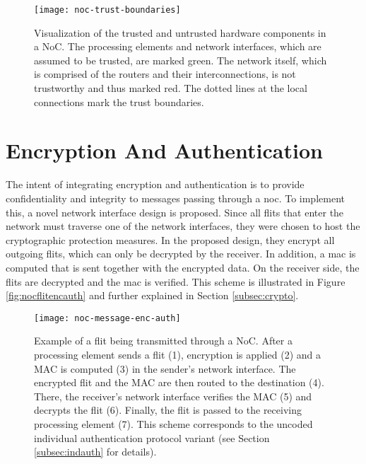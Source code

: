 \begin{figure}
    \centering
    \texttt{[image: noc-trust-boundaries]}
    \caption[Trust boundaries in a NoC]{Visualization of the trusted and untrusted hardware components in a NoC. The processing elements and network
    interfaces, which are assumed to be trusted, are marked green. The network itself, which is comprised of the routers and their interconnections,
    is not trustworthy and thus marked red. The dotted lines at the local connections mark the trust boundaries.}
    \label{fig:noctrustboundaries}
\end{figure}

\section{Encryption And Authentication}\label{sec:encandauth}
The intent of integrating encryption and authentication is to provide confidentiality and integrity to messages passing through a \gls{noc}. To
implement this, a novel network interface design is proposed. Since all flits that enter the network must traverse one of the network interfaces,
they were chosen to host the cryptographic protection measures. In the proposed design, they encrypt all outgoing flits, which can only be decrypted by the
receiver. In addition, a \gls{mac} is computed that is sent together with the encrypted data. On the receiver side, the flits are decrypted and the
\gls{mac} is verified. This scheme is illustrated in Figure \vref{fig:nocflitencauth} and further explained in Section \ref{subsec:crypto}.

\begin{figure}
    \centering
    \texttt{[image: noc-message-enc-auth]}
    \caption[Flit in a NoC with encryption and authentication]{Example of a flit being transmitted through a NoC. After a processing element sends a flit (1),
    encryption is applied (2) and a MAC is computed (3) in the sender's network interface. The encrypted flit and the MAC are then routed to the
    destination (4). There, the receiver's network interface verifies the MAC (5) and decrypts the flit (6). Finally, the flit is passed to the
    receiving processing element (7). This scheme corresponds to the uncoded individual authentication protocol variant (see Section
    \ref{subsec:indauth} for details).}
    \label{fig:nocflitencauth}
\end{figure}

